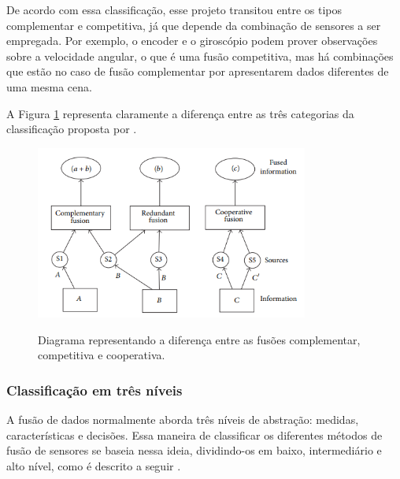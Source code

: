 \documentclass[acronym, symbols, table]{fei}
\begin{document}
				De acordo com essa classificação, esse projeto transitou entre os tipos complementar e competitiva, já que depende da combinação de sensores a ser empregada. Por exemplo, o encoder e o giroscópio podem prover observações sobre a velocidade angular, o que é uma fusão competitiva, mas há combinações que estão no caso de fusão complementar por apresentarem dados diferentes de uma mesma cena.
			
				A Figura \ref{fig:classificacao_fusao_de_sensores} representa claramente a diferença entre as três categorias da classificação proposta por \textcite{castanedo2013review}.
			
				\begin{figure}[!htb]
					\centering
					\caption{Diagrama representando a diferença entre as fusões complementar, competitiva e cooperativa.} 
					\includegraphics[width=0.8\textwidth]{classificacao_fusao_de_sensores.png}
					\label{fig:classificacao_fusao_de_sensores}
				\end{figure}
			
			\subsubsection{Classificação em três níveis}
			
				A fusão de dados normalmente aborda três níveis de abstração: medidas, características e decisões. Essa maneira de classificar os diferentes métodos de fusão de sensores se baseia nessa ideia, dividindo-os em baixo, intermediário e alto nível, como é descrito a seguir \cite{castanedo2013review}.
			
\end{document}
